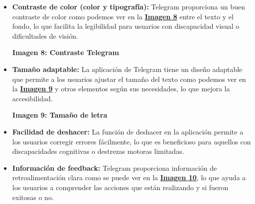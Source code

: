 \documentclass[a4paper]{article}
\newcommand{\letraTelegram}{letraTelegram.jpg}
\newcommand{\coloresTelegram}{colores_telegram.jpg}
\begin{document}
    \begin{itemize}
        \item \textbf{Contraste de color (color y tipografía):} Telegram proporciona un buen contraste de color como podemos ver en la \textbf{\hyperref[fig:imagen-contraste-telegram]{Imagen 8}} entre el texto y el fondo, lo que facilita la legibilidad para usuarios con discapacidad visual o dificultades de visión.

        \begin{center}
            \vspace{0.2cm}\par
            \textbf{Imagen 8: Contraste Telegram\label{fig:imagen-contraste-telegram}}
        \end{center}\vspace{0.1cm}

        
        \item \textbf{Tamaño adaptable:} La aplicación de Telegram tiene un diseño adaptable que permite a los usuarios ajustar el tamaño del texto como podemos ver en la \textbf{\hyperref[fig:imagen-longitud-letra]{Imagen 9}} y otros elementos según sus necesidades, lo que mejora la accesibilidad.

        \begin{center}
            \vspace{0.2cm}\par
            \textbf{Imagen 9: Tamaño de letra\label{fig:imagen-longitud-letra}}
        \end{center}\vspace{0.1cm}
        
        \item \textbf{Facilidad de deshacer:} La función de deshacer en la aplicación permite a los usuarios corregir errores fácilmente, lo que es beneficioso para aquellos con discapacidades cognitivas o destrezas motoras limitadas.
        
        \item \textbf{Información de feedback:} Telegram proporciona información de retroalimentación clara como se puede ver en la \textbf{\hyperref[fig:imagen-telegram-deshacer]{Imagen 10}}, lo que ayuda a los usuarios a comprender las acciones que están realizando y si fueron exitosas o no.


\end{itemize}
\end{document}
